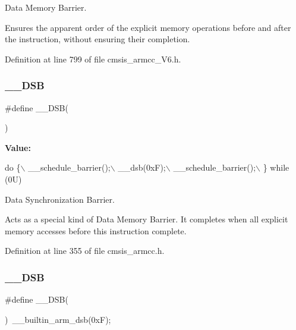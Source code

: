 Data Memory Barrier. 

Ensures the apparent order of the explicit memory operations before and after the instruction, without ensuring their completion. 

Definition at line 799 of file cmsis\+\_\+armcc\+\_\+\+V6.\+h.

\mbox{\label{group___c_m_s_i_s___core___instruction_interface_ga067d257a2b34565410acefb5afef2203}} 
\subsubsection{\texorpdfstring{\+\_\+\+\_\+\+D\+SB}{\_\_DSB}\hspace{0.1cm}{\footnotesize\ttfamily [1/2]}}
{\footnotesize\ttfamily \#define \+\_\+\+\_\+\+D\+SB(\begin{DoxyParamCaption}{ }\end{DoxyParamCaption})}

{\bfseries Value\+:}
\begin{DoxyCode}
\textcolor{keywordflow}{do} \{\(\backslash\)
                   \_\_schedule\_barrier();\(\backslash\)
                   \_\_dsb(0xF);\(\backslash\)
                   \_\_schedule\_barrier();\(\backslash\)
                \} \textcolor{keywordflow}{while} (0U)
\end{DoxyCode}


Data Synchronization Barrier. 

Acts as a special kind of Data Memory Barrier. It completes when all explicit memory accesses before this instruction complete. 

Definition at line 355 of file cmsis\+\_\+armcc.\+h.

\mbox{\label{group___c_m_s_i_s___core___instruction_interface_ga067d257a2b34565410acefb5afef2203}} 
\subsubsection{\texorpdfstring{\+\_\+\+\_\+\+D\+SB}{\_\_DSB}\hspace{0.1cm}{\footnotesize\ttfamily [2/2]}}
{\footnotesize\ttfamily \#define \+\_\+\+\_\+\+D\+SB(\begin{DoxyParamCaption}{ }\end{DoxyParamCaption})~\+\_\+\+\_\+builtin\+\_\+arm\+\_\+dsb(0x\+F);}




